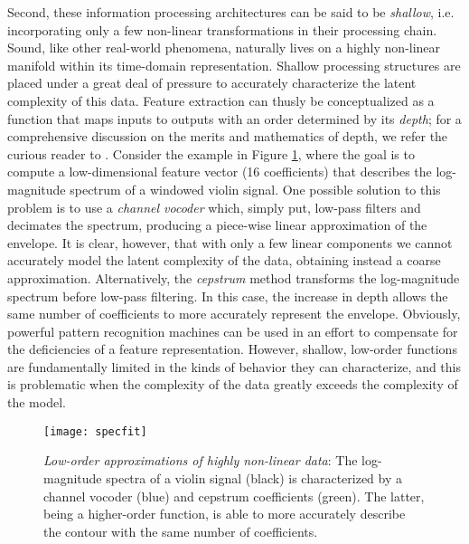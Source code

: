 Second, these information processing architectures can be said to be \emph{shallow}, i.e. incorporating only a few non-linear transformations in their processing chain.
Sound, like other real-world phenomena, naturally lives on a highly non-linear manifold within its time-domain representation.
Shallow processing structures are placed under a great deal of pressure to accurately characterize the latent complexity of this data.
Feature extraction can thusly be conceptualized as a function that maps inputs to outputs with an order determined by its \emph{depth}; for a comprehensive discussion on the merits and mathematics of depth, we refer the curious reader to \cite{Bengio2009}.
Consider the example in Figure \ref{fig:curvefit}, where the goal is to compute a low-dimensional feature vector (16 coefficients) that describes the log-magnitude spectrum of a windowed violin signal.
One possible solution to this problem is to use a \emph{channel vocoder} which, simply put, low-pass filters and decimates the spectrum, producing a piece-wise linear approximation of the envelope.
It is clear, however, that with only a few linear components we cannot accurately model the latent complexity of the data, obtaining instead a coarse approximation.
Alternatively, the \emph{cepstrum} method transforms the log-magnitude spectrum before low-pass filtering.
In this case, the increase in depth allows the same number of coefficients to more accurately represent the envelope.
Obviously, powerful pattern recognition machines can be used in an effort to compensate for the deficiencies of a feature representation.
However, shallow, low-order functions are fundamentally limited in the kinds of behavior they can characterize, and this is problematic when the complexity of the data greatly exceeds the complexity of the model.

\begin{figure}[t]
\begin{centering}
\texttt{[image: specfit]}
\caption{\emph{Low-order approximations of highly non-linear data}: The log-magnitude spectra of a violin signal (black) is characterized by a channel vocoder (blue) and cepstrum coefficients (green). The latter, being a higher-order function, is able to more accurately describe the contour with the same number of coefficients.}
\label{fig:curvefit}
\end{centering}
\end{figure}

